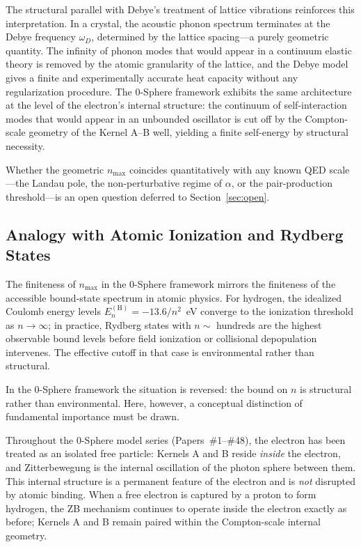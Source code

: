\documentclass[%
 reprint, amsmath,amssymb, aps, prb, ]{revtex4-2}
\numberwithin{equation}{section}
\begin{document}
The structural parallel with Debye's treatment of lattice vibrations reinforces this interpretation. In a crystal, the acoustic phonon spectrum terminates at the Debye frequency $\omega_D$, determined by the lattice spacing---a purely geometric quantity. The infinity of phonon modes that would appear in a continuum elastic theory is removed by the atomic granularity of the lattice, and the Debye model gives a finite and experimentally accurate heat capacity without any regularization procedure. The 0-Sphere framework exhibits the same architecture at the level of the electron's internal structure: the continuum of self-interaction modes that would appear in an unbounded oscillator is cut off by the Compton-scale geometry of the Kernel A--B well, yielding a finite self-energy by structural necessity.

Whether the geometric $n_{\max}$ coincides quantitatively with any known QED scale---the Landau pole, the non-perturbative regime of $\alpha$, or the pair-production threshold---is an open question deferred to Section~\ref{sec:open}.

\subsection{Analogy with Atomic Ionization and Rydberg States}
\label{sec:cutoff_rydberg}

The finiteness of $n_{\max}$ in the 0-Sphere framework mirrors the finiteness of the accessible bound-state spectrum in atomic physics. For hydrogen, the idealized Coulomb energy levels $E_n^{(\text{H})} = -13.6/n^2$~eV converge to the ionization threshold as $n \to \infty$; in practice, Rydberg states with $n \sim$ hundreds are the highest observable bound levels before field ionization or collisional depopulation intervenes. The effective cutoff in that case is environmental rather than structural.

In the 0-Sphere framework the situation is reversed: the bound on $n$ is structural rather than environmental. Here, however, a conceptual distinction of fundamental importance must be drawn.

Throughout the 0-Sphere model series (Papers~\#1--\#48), the electron has been treated as an isolated free particle: Kernels A and B reside \emph{inside} the electron, and Zitterbewegung is the internal oscillation of the photon sphere between them. This internal structure is a permanent feature of the electron and is \emph{not} disrupted by atomic binding. When a free electron is captured by a proton to form hydrogen, the ZB mechanism continues to operate inside the electron exactly as before; Kernels A and B remain paired within the Compton-scale internal geometry.
\end{document}
